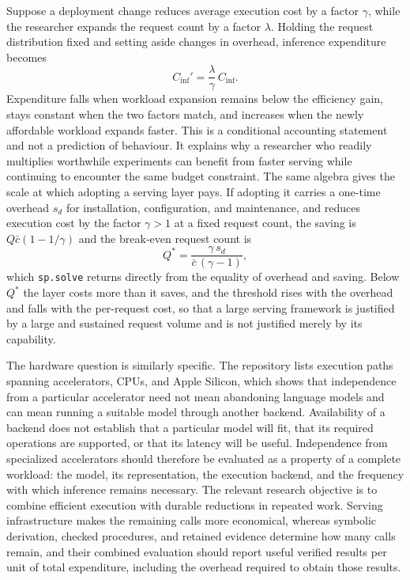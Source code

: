 \documentclass[11pt]{article}
\theoremstyle{remark}
\begin{document}
Suppose a deployment change reduces average execution cost by a factor $\gamma$, while the researcher expands the request count by a factor $\lambda$. Holding the request distribution fixed and setting aside changes in overhead, inference expenditure becomes
\begin{equation}
C_{\mathrm{inf}}' = \frac{\lambda}{\gamma}\,C_{\mathrm{inf}} .
\end{equation}
Expenditure falls when workload expansion remains below the efficiency gain, stays constant when the two factors match, and increases when the newly affordable workload expands faster. This is a conditional accounting statement and not a prediction of behaviour. It explains why a researcher who readily multiplies worthwhile experiments can benefit from faster serving while continuing to encounter the same budget constraint. The same algebra gives the scale at which adopting a serving layer pays. If adopting it carries a one-time overhead $s_d$ for installation, configuration, and maintenance, and reduces execution cost by the factor $\gamma > 1$ at a fixed request count, the saving is $Q\bar c(1 - 1/\gamma)$ and the break-even request count is
\begin{equation}
Q^{*} = \frac{\gamma\, s_d}{\bar c\,(\gamma - 1)},
\end{equation}
which \verb|sp.solve| returns directly from the equality of overhead and saving. Below $Q^{*}$ the layer costs more than it saves, and the threshold rises with the overhead and falls with the per-request cost, so that a large serving framework is justified by a large and sustained request volume and is not justified merely by its capability.

The hardware question is similarly specific. The repository lists execution paths spanning accelerators, CPUs, and Apple Silicon, which shows that independence from a particular accelerator need not mean abandoning language models and can mean running a suitable model through another backend. Availability of a backend does not establish that a particular model will fit, that its required operations are supported, or that its latency will be useful. Independence from specialized accelerators should therefore be evaluated as a property of a complete workload: the model, its representation, the execution backend, and the frequency with which inference remains necessary. The relevant research objective is to combine efficient execution with durable reductions in repeated work. Serving infrastructure makes the remaining calls more economical, whereas symbolic derivation, checked procedures, and retained evidence determine how many calls remain, and their combined evaluation should report useful verified results per unit of total expenditure, including the overhead required to obtain those results.
\end{document}
